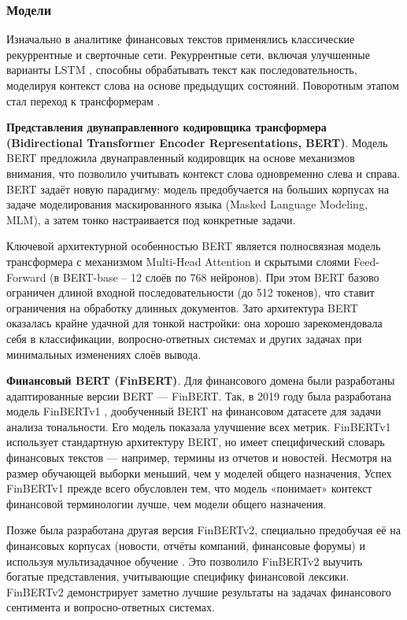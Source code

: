 \subsubsection{Модели}
Изначально в аналитике финансовых текстов применялись классические рекуррентные \parencite{RNN1986} и сверточные \parencite{CNN1998lecun} сети.
Рекуррентные сети, включая улучшенные варианты LSTM \parencite{Hochreiter1997LSTM}, способны обрабатывать текст как последовательность,
моделируя контекст слова на основе предыдущих состояний. Поворотным этапом стал переход к трансформерам \parencite{vaswani2017attention}.


\textbf{Представления двунаправленного кодировщика трансформера (Bidirectional Transformer Encoder Representations,
BERT)}. Модель BERT \parencite{devlin2019BERT} предложила двунаправленный кодировщик на основе механизмов внимания,
что позволило учитывать контекст слова одновременно слева и справа. BERT задаёт новую парадигму: модель предобучается
на больших корпусах на задаче моделирования маскированного языка (Masked Language Modeling, MLM), а затем тонко
настраивается под конкретные задачи.

Ключевой архитектурной особенностью BERT является полносвязная модель трансформера с механизмом Multi-Head Attention
и скрытыми слоями Feed-Forward (в BERT-base – 12 слоёв по 768 нейронов). При этом BERT базово ограничен длиной входной
последовательности (до 512 токенов), что ставит ограничения на обработку длинных документов. Зато архитектура BERT
оказалась крайне удачной для тонкой настройки: она хорошо зарекомендовала себя в классификации, вопросно-ответных
системах и других задачах при минимальных изменениях слоёв вывода.



\textbf{Финансовый BERT (FinBERT)}. Для финансового домена были разработаны адаптированные версии BERT --- FinBERT.
Так, в 2019 году была разработана модель FinBERTv1 \parencite{Araci2019FinBERT}, дообученный BERT на финансовом датасете для задачи
анализа тональности. Его модель показала улучшение всех метрик. FinBERTv1 использует стандартную архитектуру BERT,
но имеет специфический словарь финансовых текстов — например, термины из отчетов и новостей. Несмотря на размер
обучающей выборки меньший, чем у моделей общего назначения, Успех FinBERTv1 прежде всего обусловлен тем, что
модель «понимает» контекст финансовой терминологии лучше, чем модели общего назначения.

Позже была разработана другая версия FinBERTv2, специально предобучая её на финансовых корпусах (новости,
отчёты компаний, финансовые форумы) и используя мультизадачное обучение \parencite{Liu2020FinBERT}. Это
позволило FinBERTv2 выучить богатые представления, учитывающие специфику финансовой лексики. FinBERTv2
демонстрирует заметно лучшие результаты на задачах финансового сентимента и вопросно-ответных системах.

